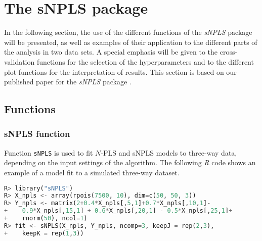 \section{The sNPLS package}
In the following section, the use of the different functions of the \textit{sNPLS} package will be presented, as well as examples of their application to the different parts of the analysis in two data sets. A special emphasis will be given to the cross-validation functions for the selection of the hyperparameters and to the different plot functions for the interpretation of results. This section is based on our published paper for the \textit{sNPLS} package \parencite{hervas2018sparse}.

\subsection{Functions}
\subsubsection{sNPLS function}
Function \texttt{sNPLS} is used to fit $N$-PLS and sNPLS models to three-way data, depending on the input settings of the algorithm. The following \textit{R} code shows an example of a model fit to a simulated three-way dataset.
\vspace{15pt}
\begin{lstlisting}[basicstyle=\small, language=Python]
R> library("sNPLS")
R> X_npls <- array(rpois(7500, 10), dim=c(50, 50, 3))
R> Y_npls <- matrix(2+0.4*X_npls[,5,1]+0.7*X_npls[,10,1]- 
+    0.9*X_npls[,15,1] + 0.6*X_npls[,20,1] - 0.5*X_npls[,25,1]+
+    rnorm(50), ncol=1)
R> fit <- sNPLS(X_npls, Y_npls, ncomp=3, keepJ = rep(2,3), 
+    keepK = rep(1,3))
\end{lstlisting}

